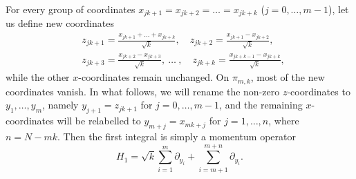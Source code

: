 \documentclass[12pt]{amsart}
\numberwithin{equation}{section}
\theoremstyle{definition}
\begin{document}
For every group of coordinates $x_{jk + 1} = x_{jk + 2} = \dots = x_{jk + k}$ ($j = 0 , \ldots, m-1$), let us define new coordinates
\begin{align*}
    &z_{jk + 1} = \frac{x_{jk + 1} + \dots + x_{jk + k}}{\sqrt{k}}, \quad  z_{jk + 2}  = \frac{x_{jk + 1} - x_{jk + 2}}{\sqrt{k}}, 
    \\
     &z_{jk + 3} = \frac{x_{jk + 2} - x_{jk + 3}}{\sqrt{k}}, \ \ldots \ , \quad  z_{jk + k} = \frac{x_{jk + k -1} - x_{jk + k}}{\sqrt{k}},
\end{align*}
while the other $x$-coordinates remain unchanged. On $\pi_{m,k}$, most of the new coordinates vanish. 
In what follows, we will rename the non-zero $z$-coordinates to $y_1, \dots, y_m$, namely $y_{j+1} = z_{jk + 1}$ for $j = 0, \dots, m-1$, and the remaining $x$-coordinates will be relabelled to $y_{m+j} = x_{mk+j}$ for $j=1, \dots, n$, where $n = N - mk$.
Then the first integral is simply a momentum operator
\begin{equation*}
    H_1 = \sqrt{k} \sum\limits_{i = 1}^m  \partial_{y_i} + \sum\limits_{i = m+ 1}^{m + n} \partial_{y_i}.
\end{equation*}
\end{document}
